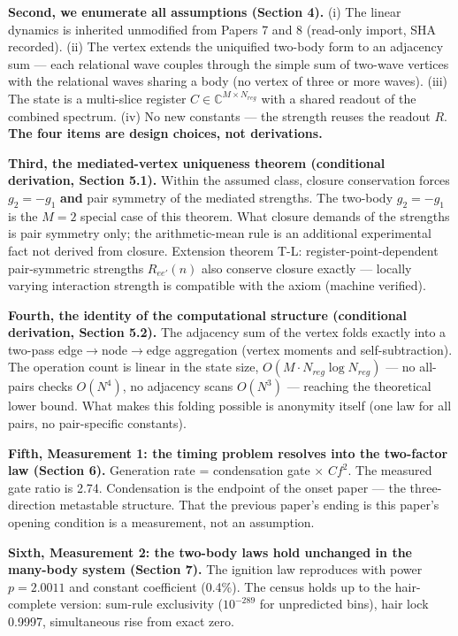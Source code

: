\documentclass[
  a4paper,
]{article}
\begin{document}
\textbf{Second, we enumerate all assumptions (Section 4).} (i) The
linear dynamics is inherited unmodified from Papers 7 and 8 (read-only
import, SHA recorded). (ii) The vertex extends the uniquified two-body
form to an adjacency sum --- each relational wave couples through the
simple sum of two-wave vertices with the relational waves sharing a body
(no vertex of three or more waves). (iii) The state is a multi-slice
register \(C\in\mathbb{C}^{M\times N_{reg}}\) with a shared readout of
the combined spectrum. (iv) No new constants --- the strength reuses the
readout \(R\). \textbf{The four items are design choices, not
derivations.}

\textbf{Third, the mediated-vertex uniqueness theorem (conditional
derivation, Section 5.1).} Within the assumed class, closure
conservation forces \(g_2=-g_1\) \textbf{and} pair symmetry of the
mediated strengths. The two-body \(g_2=-g_1\) is the \(M=2\) special
case of this theorem. What closure demands of the strengths is pair
symmetry only; the arithmetic-mean rule is an additional experimental
fact not derived from closure. Extension theorem T-L:
register-point-dependent pair-symmetric strengths \(R_{ee'}(n)\) also
conserve closure exactly --- locally varying interaction strength is
compatible with the axiom (machine verified).

\textbf{Fourth, the identity of the computational structure (conditional
derivation, Section 5.2).} The adjacency sum of the vertex folds exactly
into a two-pass edge\(\to\)node\(\to\)edge aggregation (vertex moments
and self-subtraction). The operation count is linear in the state size,
\(O(M\cdot N_{reg}\log N_{reg})\) --- no all-pairs checks \(O(N^4)\), no
adjacency scans \(O(N^3)\) --- reaching the theoretical lower bound.
What makes this folding possible is anonymity itself (one law for all
pairs, no pair-specific constants).

\textbf{Fifth, Measurement 1: the timing problem resolves into the
two-factor law (Section 6).} Generation rate = condensation gate
\(\times\) \(Cf^2\). The measured gate ratio is 2.74. Condensation is
the endpoint of the onset paper --- the three-direction metastable
structure. That the previous paper's ending is this paper's opening
condition is a measurement, not an assumption.

\textbf{Sixth, Measurement 2: the two-body laws hold unchanged in the
many-body system (Section 7).} The ignition law reproduces with power
\(p=2.0011\) and constant coefficient (0.4\%). The census holds up to
the hair-complete version: sum-rule exclusivity (\(10^{-289}\) for
unpredicted bins), hair lock 0.9997, simultaneous rise from exact zero.
\end{document}
